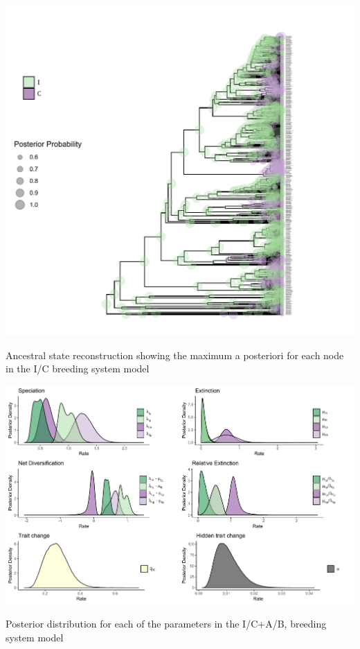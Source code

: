 \begin{suppfigure}
\includegraphics[width=\textwidth]{asrIC.pdf}
\caption{Ancestral state reconstruction showing the maximum a posteriori for each node in the I/C breeding system model} %
\label{suppfigure:ICasr}
\end{suppfigure}

\begin{suppfigure}
\includegraphics[width=\textwidth]{hisseSInoretposteriordist.pdf}
\caption{Posterior distribution for each of the parameters in the I/C+A/B, breeding system model} %
\label{suppfigure:ICAB}
\end{suppfigure}

